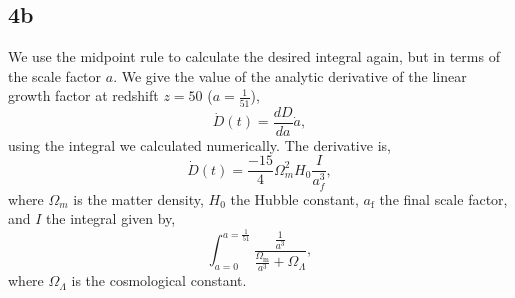 \subsection{4b}



We use the midpoint rule to calculate the desired integral again, but in terms
of the scale factor $a$. We give the value of the analytic derivative of the
linear growth factor at redshift $z=50$ ($a = \frac{1}{51}$),
\begin{equation}
 \dot D(t) = \frac{dD}{da}\dot a,
\end{equation}
using the integral we calculated numerically. The derivative is,
\begin{equation}
 \dot D(t) = \frac{-15}{4}\Omega_m^2 H_0 \frac{I}{a_f^3},
\end{equation}
where $\Omega_m$ is the matter density, $H_0$ the Hubble constant,
$a_{\textrm{f}}$ the final scale factor, and $I$ the integral given by,
\begin{equation}
 \int_{a=0}^{a=\frac{1}{51}} \frac{\frac{1}{a^3}}
        {{\frac{\Omega_{\textrm{m}}}{a^3}} + \Omega_{\Lambda}},
\end{equation}
where $\Omega_{\Lambda}$ is the cosmological constant.
